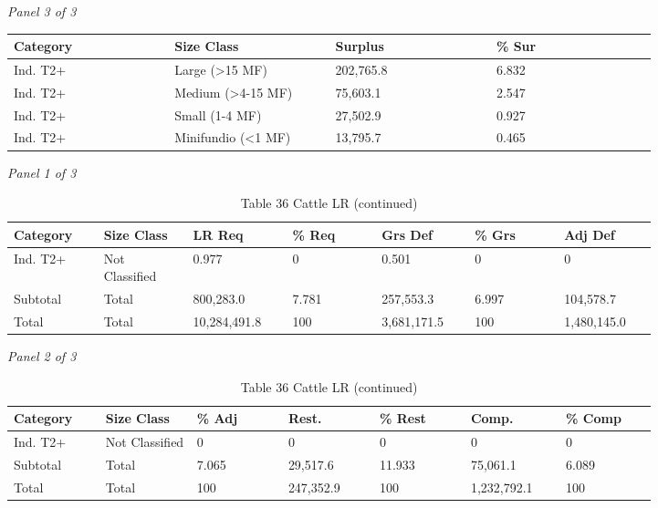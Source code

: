 \documentclass[12pt]{article}
\begin{document}
\begin{landscape}
\begin{table}[H]
\vspace{0.6em}

\textit{Panel 3 of 3}\\[2pt]
{\fontsize{12}{14}\selectfont
\setlength{\tabcolsep}{3pt}
\renewcommand{\arraystretch}{1.08}
\begin{tabular}{p{0.205\linewidth}p{0.205\linewidth}p{0.205\linewidth}p{0.205\linewidth}}
\toprule
Category & Size Class & Surplus & \% Sur \\
\midrule
Ind. T2+ & Large (>15 MF) & 202,765.8 & 6.832 \\
Ind. T2+ & Medium (>4-15 MF) & 75,603.1 & 2.547 \\
Ind. T2+ & Small (1-4 MF) & 27,502.9 & 0.927 \\
Ind. T2+ & Minifundio (<1 MF) & 13,795.7 & 0.465 \\
\bottomrule
\end{tabular}
}
\end{table}
\begin{table}[H]
\centering
\caption{Table 36 Cattle LR (continued)}
\textit{Panel 1 of 3}\\[2pt]
{\fontsize{12}{14}\selectfont
\setlength{\tabcolsep}{3pt}
\renewcommand{\arraystretch}{1.08}
\begin{tabular}{p{0.117\linewidth}p{0.117\linewidth}p{0.117\linewidth}p{0.117\linewidth}p{0.117\linewidth}p{0.117\linewidth}p{0.117\linewidth}}
\toprule
Category & Size Class & LR Req & \% Req & Grs Def & \% Grs & Adj Def \\
\midrule
Ind. T2+ & Not Classified & 0.977 & 0 & 0.501 & 0 & 0 \\
Subtotal & Total & 800,283.0 & 7.781 & 257,553.3 & 6.997 & 104,578.7 \\
Total & Total & 10,284,491.8 & 100 & 3,681,171.5 & 100 & 1,480,145.0 \\
\bottomrule
\end{tabular}
}

\vspace{0.6em}

\textit{Panel 2 of 3}\\[2pt]
{\fontsize{12}{14}\selectfont
\setlength{\tabcolsep}{3pt}
\renewcommand{\arraystretch}{1.08}
\begin{tabular}{p{0.117\linewidth}p{0.117\linewidth}p{0.117\linewidth}p{0.117\linewidth}p{0.117\linewidth}p{0.117\linewidth}p{0.117\linewidth}}
\toprule
Category & Size Class & \% Adj & Rest. & \% Rest & Comp. & \% Comp \\
\midrule
Ind. T2+ & Not Classified & 0 & 0 & 0 & 0 & 0 \\
Subtotal & Total & 7.065 & 29,517.6 & 11.933 & 75,061.1 & 6.089 \\
Total & Total & 100 & 247,352.9 & 100 & 1,232,792.1 & 100 \\
\bottomrule
\end{tabular}
}


\end{table}
\end{landscape}
\end{document}
